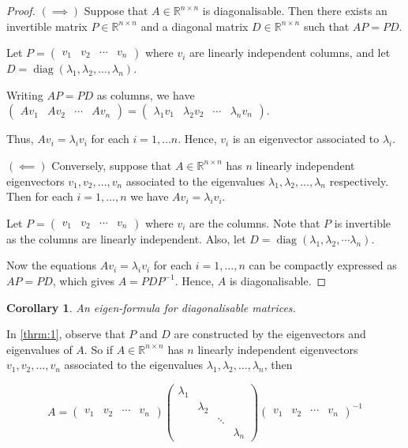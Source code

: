 \documentclass[a4paper]{article}
\theoremstyle{plain}
\newtheorem{corollary}[theorem]{Corollary}
\theoremstyle{definition}
\begin{document}
\begin{proof}
	$(\implies)$ Suppose that $A\in\mathbb{R}^{n\times n}$ is diagonalisable. Then there exists an invertible matrix
	$P\in\mathbb{R}^{n\times n}$ and a diagonal matrix $D\in\mathbb{R}^{n\times n}$ such that $AP=PD$.

	Let $P=\begin{pmatrix}v_1 & v_2 & \cdots & v_n \end{pmatrix}$ where $v_i$ are linearly independent columns, and let
	$D=\operatorname{diag}(\lambda_1,\lambda_2,\ldots,\lambda_n)$.

	Writing $AP=PD$ as columns, we have $\begin{pmatrix}Av_1 & Av_2 & \cdots & Av_n\end{pmatrix}=
		\begin{pmatrix}\lambda_1v_1 & \lambda_2v_2 & \cdots & \lambda_nv_n\end{pmatrix}$.

	Thus, $Av_i=\lambda_iv_i$ for each $i=1,\ldots n$. Hence, $v_i$ is an eigenvector associated to $\lambda_i$.

	$(\impliedby)$ Conversely, suppose that $A\in\mathbb{R}^{n\times n}$ has $n$ linearly independent eigenvectors
	$v_1,v_2,\ldots,v_n$ associated to the eigenvalues $\lambda_1,\lambda_2,\ldots,\lambda_n$ respectively. Then for each
	$i=1,\ldots,n$ we have $Av_i=\lambda_iv_i$.

	Let $P=\begin{pmatrix}v_1 & v_2 & \cdots & v_n\end{pmatrix}$ where $v_i$ are the columns. Note that $P$ is invertible
	as the columns are linearly independent. Also, let $D=\operatorname{diag}(\lambda_1,\lambda_2,\cdots\lambda_n)$.

	Now the equations $Av_i=\lambda_iv_i$ for each $i=1,\ldots,n$ can be compactly expressed as $AP=PD$, which gives
	$A=PDP^{-1}$. Hence, $A$ is diagonalisable.
\end{proof}

\begin{corollary}
	\label{cor:2}
	An eigen-formula for diagonalisable matrices.
\end{corollary}

In \ref{thrm:1}, observe that $P$ and $D$ are constructed by the eigenvectors and eigenvalues of $A$. So if
$A\in\mathbb{R}^{n\times n}$ has $n$ linearly independent eigenvectors $v_1,v_2,\ldots,v_n$ associated to the eigenvalues
$\lambda_1,\lambda_2,\ldots,\lambda_n$, then

\[
	A=\begin{pmatrix}v_1 & v_2 & \cdots & v_n\end{pmatrix}
	\begin{pmatrix}
		\lambda_1 &           &        &           \\
		          & \lambda_2 &        &           \\
		          &           & \ddots &           \\
		          &           &        & \lambda_n
	\end{pmatrix}
	\begin{pmatrix}v_1 & v_2 & \cdots & v_n\end{pmatrix}^{-1}
\]
\end{document}
